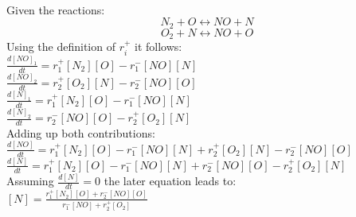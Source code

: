 \documentclass[10pt,a4paper]{scrartcl}
\begin{document}
\begin{multicols*}{3}
\begin{minipage}{0.5\columnwidth}
           \end{minipage} \\
Given the reactions:
\begin{equation} N_2+O \leftrightarrow NO+N \end{equation}
\begin{equation} O_2+N \leftrightarrow NO+O \end{equation}
Using the definition of $r_i^+$ it follows: \\
$\frac{d[NO]_1}{dt}=r_1^+[N_2][O]-r_1^-[NO][N]$\\
$\frac{d[NO]_2}{dt}=r_2^+[O_2][N]-r_2^-[NO][O]$\\
$\frac{d[N]_1}{dt}=r_1^+[N_2][O]-r_1^-[NO][N]$\\
$\frac{d[N]_2}{dt}=r_2^-[NO][O]-r_2^+[O_2][N]$\\
Adding up both contributions:\\
$\frac{d[NO]}{dt}=r_1^+[N_2][O]-r_1^-[NO][N]+r_2^+[O_2][N]-r_2^-[NO][O]$\\
$\frac{d[N]}{dt}=r_1^+[N_2][O]-r_1^-[NO][N]+r_2^-[NO][O]-r_2^+[O_2][N]$\\

Assuming $\frac{d[N]}{dt}=0$ the later equation leads to:\\
$[N]=\frac{r_1^+[N_2][O]+r_2^-[NO][O]}{r_1^-[NO]+r_2^+[O_2]}$


\end{multicols*}
\end{document}
